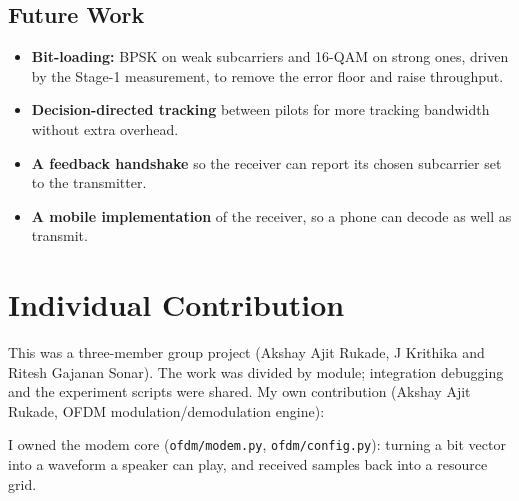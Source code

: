 \documentclass[11pt,a4paper]{report}
\begin{document}
\section{Future Work}
\begin{itemize}
    \item \textbf{Bit-loading:} BPSK on weak subcarriers and 16-QAM on strong ones,
    driven by the Stage-1 measurement, to remove the error floor and raise throughput.
    \item \textbf{Decision-directed tracking} between pilots for more tracking bandwidth
    without extra overhead.
    \item \textbf{A feedback handshake} so the receiver can report its chosen subcarrier
    set to the transmitter.
    \item \textbf{A mobile implementation} of the receiver, so a phone can decode as
    well as transmit.
\end{itemize}

\chapter{Individual Contribution}

This was a three-member group project (Akshay Ajit Rukade, J Krithika and Ritesh Gajanan Sonar). The work was divided by module;
integration debugging and the experiment scripts were shared. My own contribution
(Akshay Ajit Rukade, OFDM modulation/demodulation engine):

I owned the modem core (\texttt{ofdm/modem.py}, \texttt{ofdm/config.py}): turning a
bit vector into a waveform a speaker can play, and received samples back into a
resource grid.
\end{document}
